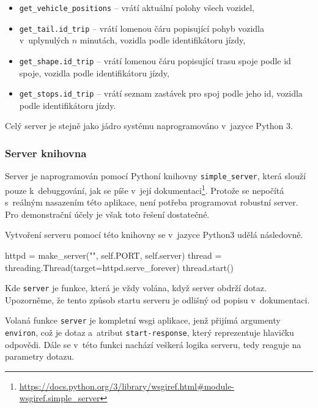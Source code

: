 \begin{itemize}
	\item \verb-get_vehicle_positions- -- vrátí aktuální polohy všech vozidel,


	\item \verb-get_tail.id_trip- -- vrátí lomenou čáru popisující pohyb vozidla v~uplynulých $n$ minutách, vozidla podle identifikátoru jízdy,


	\item \verb-get_shape.id_trip- -- vrátí lomenou čáru popisující trasu spoje podle id spoje, vozidla podle identifikátoru jízdy,


	\item \verb-get_stops.id_trip- -- vrátí seznam zastávek pro spoj podle jeho id, vozidla podle identifikátoru jízdy.
\end{itemize}


Celý server je stejně jako jádro systému naprogramováno v~jazyce Python 3.


\subsubsection{Server knihovna}


Server je naprogramován pomocí Pythoní knihovny \verb-simple_server-, která slouží pouze k~debuggování, jak se píše v~její dokumentaci\footnote{\url{https://docs.python.org/3/library/wsgiref.html\#module-wsgiref.simple_server}}. Protože se nepočítá s~reálným nasazením této aplikace, není potřeba programovat robustní server. Pro demonstrační účely je však toto řešení dostatečné.


\bigbreak


Vytvoření serveru pomocí této knihovny se v~jazyce Python3 udělá následovně.


\begin{code}[frame=none]
httpd = make_server("", self.PORT, self.server)
thread = threading.Thread(target=httpd.serve_forever)
thread.start()
\end{code}


Kde \verb-server- je funkce, která je vždy volána, když server obdrží dotaz. Upozorněme, že tento způsob startu serveru je odlišný od popisu v~dokumentaci.


\bigbreak


Volaná funkce \verb-server- je kompletní \gls{wsgi} aplikace, jenž přijímá argumenty \verb-environ-, což je dotaz a~atribut \verb:start-response:, který reprezentuje hlavičku odpovědi. Dále se v~této funkci nachází veškerá logika serveru, tedy reaguje na parametry dotazu.


